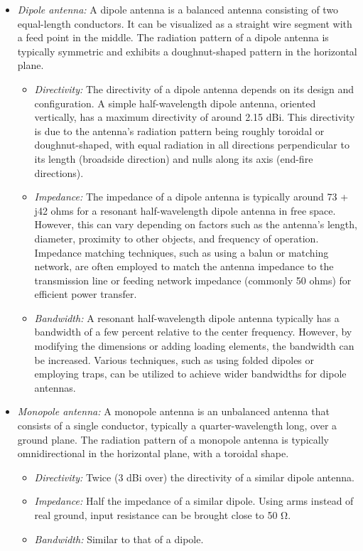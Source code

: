 \documentclass[11pt,a4paper]{article}
\renewcommand{\ohm}{{\mathrm{\Omega}}}
\begin{document}
\begin{itemize}
    \item \emph{Dipole antenna:} A dipole antenna is a balanced antenna consisting of two equal-length conductors. It can be visualized as a straight wire segment with a feed point in the middle. The radiation pattern of a dipole antenna is typically symmetric and exhibits a doughnut-shaped pattern in the horizontal plane.
    \begin{itemize}
        \item \emph{Directivity:} The directivity of a dipole antenna depends on its design and configuration. A simple half-wavelength dipole antenna, oriented vertically, has a maximum directivity of around 2.15 dBi. This directivity is due to the antenna's radiation pattern being roughly toroidal or doughnut-shaped, with equal radiation in all directions perpendicular to its length (broadside direction) and nulls along its axis (end-fire directions).
        \item \emph{Impedance:} The impedance of a dipole antenna is typically around 73 + j42 ohms for a resonant half-wavelength dipole antenna in free space. However, this can vary depending on factors such as the antenna's length, diameter, proximity to other objects, and frequency of operation. Impedance matching techniques, such as using a balun or matching network, are often employed to match the antenna impedance to the transmission line or feeding network impedance (commonly 50 ohms) for efficient power transfer.
        \item \emph{Bandwidth:} A resonant half-wavelength dipole antenna typically has a bandwidth of a few percent relative to the center frequency. However, by modifying the dimensions or adding loading elements, the bandwidth can be increased. Various techniques, such as using folded dipoles or employing traps, can be utilized to achieve wider bandwidths for dipole antennas.
    \end{itemize}

    \item \emph{Monopole antenna:} A monopole antenna is an unbalanced antenna that consists of a single conductor, typically a quarter-wavelength long, over a ground plane. The radiation pattern of a monopole antenna is typically omnidirectional in the horizontal plane, with a toroidal shape.
    \begin{itemize}
        \item \emph{Directivity:} Twice (3 dBi over) the directivity of a similar dipole antenna.
        \item \emph{Impedance:} Half the impedance of a similar dipole. Using arms instead of real ground, input resistance can be brought close to 50 $\ohm$.
        \item \emph{Bandwidth:} Similar to that of a dipole.
    \end{itemize}
    

\end{itemize}
\end{document}
